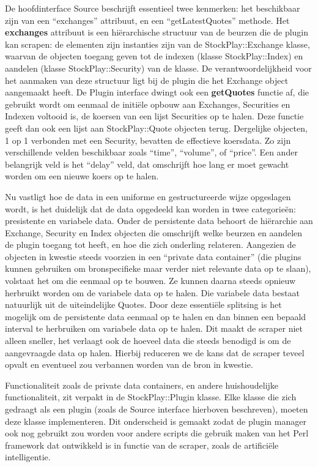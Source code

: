 De hoofdinterface Source beschrijft essentieel twee kenmerken: het beschikbaar zijn van een ``exchanges'' attribuut, en een ``getLatestQuotes'' methode. Het \textbf{exchanges} attribuut is een hi\"erarchische structuur van de beurzen die de plugin kan scrapen: de elementen zijn instanties zijn van de StockPlay::Exchange klasse, waarvan de objecten toegang geven tot de indexen (klasse StockPlay::Index) en aandelen (klasse StockPlay::Security) van de klasse. De verantwoordelijkheid voor het aanmaken van deze structuur ligt bij de plugin die het Exchange object aangemaakt heeft.
De Plugin interface dwingt ook een \textbf{getQuotes} functie af, die gebruikt wordt om eenmaal de initi\"ele opbouw aan Exchanges, Securities en Indexen voltooid is, de koersen van een lijst Securities op te halen. Deze functie geeft dan ook een lijst aan StockPlay::Quote objecten terug. Dergelijke objecten, 1 op 1 verbonden met een Security, bevatten de effectieve koersdata. Zo zijn verschillende velden beschikbaar zoals ``time'', ``volume'', of ``price''. Een ander belangrijk veld is het ``delay'' veld, dat omschrijft hoe lang er moet gewacht worden om een nieuwe koers op te halen.

Nu vastligt hoe de data in een uniforme en gestructureerde wijze opgeslagen wordt, is het duidelijk dat de data opgedeeld kan worden in twee categorie\"en: presistente en variabele data.
Onder de persistente data behoort de hi\"erarchie aan Exchange, Security en Index objecten die omschrijft welke beurzen en aandelen de plugin toegang tot heeft, en hoe die zich onderling relateren. Aangezien de objecten in kwestie steeds voorzien in een ``private data container'' (die plugins kunnen gebruiken om bronspecifieke maar verder niet relevante data op te slaan), volstaat het om die eenmaal op te bouwen. Ze kunnen daarna steeds opnieuw herbruikt worden om de variabele data op te halen. Die variabele data bestaat natuurlijk uit de uiteindelijke Quotes.
Door deze essenti\"ele splitsing is het mogelijk om de persistente data eenmaal op te halen en dan binnen een bepaald interval te herbruiken om variabele data op te halen. Dit maakt de scraper niet alleen sneller, het verlaagt ook de hoeveel data die steeds benodigd is om de aangevraagde data op halen. Hierbij reduceren we de kans dat de scraper teveel opvalt en eventueel zou verbannen worden van de bron in kwestie.

Functionaliteit zoals de private data containers, en andere huishoudelijke functionaliteit, zit verpakt in de StockPlay::Plugin klasse. Elke klasse die zich gedraagt als een plugin (zoals de Source interface hierboven beschreven), moeten deze klasse implementeren. Dit onderscheid is gemaakt zodat de plugin manager ook nog gebruikt zou worden voor andere scripts die gebruik maken van het Perl framework dat ontwikkeld is in functie van de scraper, zoals de artifici\"ele intelligentie.

